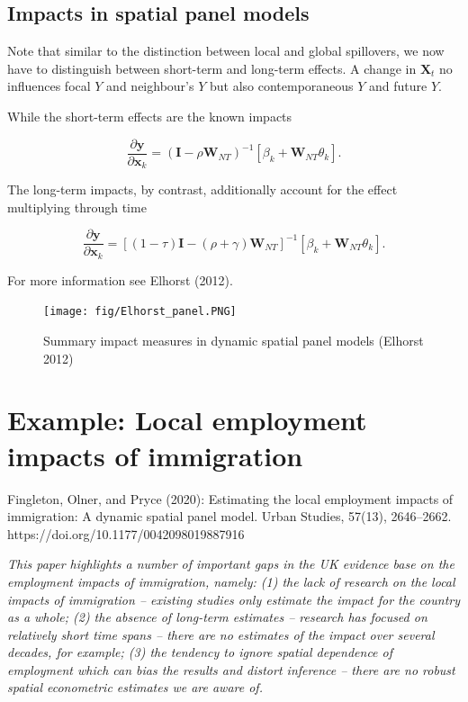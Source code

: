 \documentclass[
  letterpaper,
]{scrbook}
\begin{document}
\hypertarget{impacts-in-spatial-panel-models}{%
\subsection{Impacts in spatial panel
models}\label{impacts-in-spatial-panel-models}}

Note that similar to the distinction between local and global
spillovers, we now have to distinguish between short-term and long-term
effects. A change in \(\boldsymbol{\mathbf{X}}_t\) no influences focal
\(Y\) and neighbour's \(Y\) but also contemporaneous \(Y\) and future
\(Y\).

While the short-term effects are the known impacts

\[
\frac{\partial {\boldsymbol{\mathbf{y}}}}{\partial {\boldsymbol{\mathbf{x}}}_k} = ({\boldsymbol{\mathbf{I}}}-\rho{\boldsymbol{\mathbf{W}}_{NT}})^{-1}\left[\beta_k+{\boldsymbol{\mathbf{W}}_{NT}}\theta_k\right].
\]

The long-term impacts, by contrast, additionally account for the effect
multiplying through time

\[
\frac{\partial {\boldsymbol{\mathbf{y}}}}{\partial {\boldsymbol{\mathbf{x}}}_k} = [(1-\tau){\boldsymbol{\mathbf{I}}}-(\rho+\gamma){\boldsymbol{\mathbf{W}}_{NT}}]^{-1}\left[\beta_k+{\boldsymbol{\mathbf{W}}_{NT}}\theta_k\right].
\]

For more information see Elhorst (2012).

\begin{figure}

{\centering \texttt{[image: fig/Elhorst\_panel.PNG]}

}

\caption{Summary impact measures in dynamic spatial panel models
(Elhorst 2012)}

\end{figure}

\hypertarget{example-local-employment-impacts-of-immigration}{%
\section{Example: Local employment impacts of
immigration}\label{example-local-employment-impacts-of-immigration}}

Fingleton, Olner, and Pryce (2020): Estimating the local employment
impacts of immigration: A dynamic spatial panel model. Urban Studies,
57(13), 2646--2662. https://doi.org/10.1177/0042098019887916

\emph{This paper highlights a number of important gaps in the UK
evidence base on the employment impacts of immigration, namely: (1) the
lack of research on the local impacts of immigration -- existing studies
only estimate the impact for the country as a whole; (2) the absence of
long-term estimates -- research has focused on relatively short time
spans -- there are no estimates of the impact over several decades, for
example; (3) the tendency to ignore spatial dependence of employment
which can bias the results and distort inference -- there are no robust
spatial econometric estimates we are aware of.}
\end{document}

